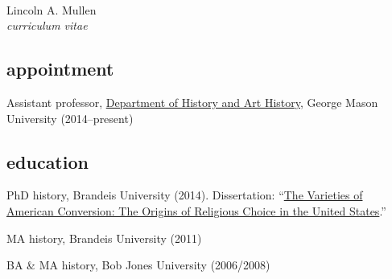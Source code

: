 \documentclass[11pt]{article}
\begin{document}
\thispagestyle{fancy}
\fancyfoot{}
\fancyhead{}
\renewcommand{\headrulewidth}{0pt}

\hfill\hfill\hfill
\hfill\hfill\hfill
\hfill\hfill\hfill
\hfill\hfill\hfill
\begin{minipage}[t]{1.4in}
   \\
\end{minipage}
\hfill
\begin{minipage}[t]{1.9in}
\end{minipage}

\vspace{0.5in}

{\Large Lincoln A. Mullen}\\
\emph{curriculum vitae}\\[0.5cm]

\vspace{0.05in}

\subsection{appointment}\label{appointment}

Assistant professor, \href{http://historyarthistory.gmu.edu/}{Department
of History and Art History}, George Mason University (2014--present)

\subsection{education}\label{education}

PhD history, Brandeis University (2014). Dissertation:
``\href{/research/\#dissertation}{The Varieties of American Conversion:
The Origins of Religious Choice in the United States}.''

MA history, Brandeis University (2011)

BA \& MA history, Bob Jones University (2006/2008)
\end{document}
